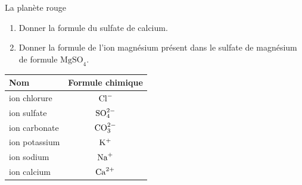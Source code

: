 \documentclass[12pt,a4paper]{article}
\begin{document}
\begin{exo}{La planète rouge}
\begin{multicols}{2}
\begin{enumerate}
Donner la formule du chlorure de sodium.

\item \anarai{} 

Donner la formule du sulfate de calcium.

\item \anarai{} 

Donner la formule de l'ion magnésium présent dans le sulfate de magnésium de formule $\text{MgSO}_\text{4}$.
\end{enumerate}

\hfill
\begin{center}
\begin{tabular}{l | c}
\textbf{Nom} & \textbf{Formule chimique} \\
\hline\hline
ion chlorure		& $\mathrm{Cl}^\mathrm{-}$ \\
ion sulfate			& $\mathrm{SO}_\mathrm{4}^\mathrm{2-}$ \\
ion carbonate	& $\mathrm{CO}_\mathrm{3}^\mathrm{2-}$ \\
ion potassium 	& $\mathrm{K}^\mathrm{+}$ \\
ion sodium     	& $\mathrm{Na}^\mathrm{+}$ \\
ion calcium		& $\mathrm{Ca}^\mathrm{2+}$ \\
\end{tabular}
\end{center}

\end{multicols}

\end{exo}

\vfill
\makecptces
\end{document}
